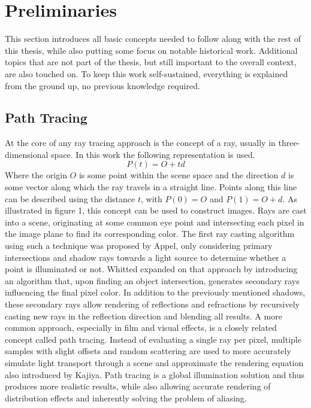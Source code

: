\section{Preliminaries}
This section introduces all basic concepts needed to follow along with the rest of this thesis, while also putting some focus on notable historical work. Additional topics that are not part of the thesis, but still important to the overall context, are also touched on. To keep this work self-sustained, everything is explained from the ground up, no previous knowledge required.
\subsection{Path Tracing}
At the core of any ray tracing approach is the concept of a ray, usually in three-dimensional space. In this work the following representation is used.
\[P(t)=O+td\]
Where the origin $O$ is some point within the scene space and the direction $d$ is some vector along which the ray travels in a straight line. Points along this line can be described using the distance $t$, with $P(0)=O$ and $P(1)=O+d$. 
As illustrated in figure 1, this concept can be used to construct images. Rays are cast into a scene, originating at some common eye point and intersecting each pixel in the image plane to find its corresponding color. The first ray casting algorithm using such a technique was proposed by Appel\cite{appel1968}, only considering primary intersections and shadow rays towards a light source to determine whether a point is illuminated or not. Whitted\cite{whitted_improved_1980} expanded on that approach by introducing an algorithm that, upon finding an object intersection, generates secondary rays influencing the final pixel color. In addition to the previously mentioned shadows, these secondary rays allow rendering of reflections and refractions by recursively casting new rays in the reflection direction and blending all results. 
A more common approach, especially in film and visual effects\cite{keller2015path_tracing_revolution}, is a closely related concept called path tracing\cite{kajiya_rendering_1986}. Instead of evaluating a single ray per pixel, multiple samples with slight offsets and random scattering are used to more accurately simulate light transport through a scene and approximate the rendering equation also introduced by Kajiya. Path tracing is a global illumination solution and thus produces more realistic results, while also allowing accurate rendering of distribution effects\cite{cook_distributed_1984} and inherently solving the problem of aliasing. 
